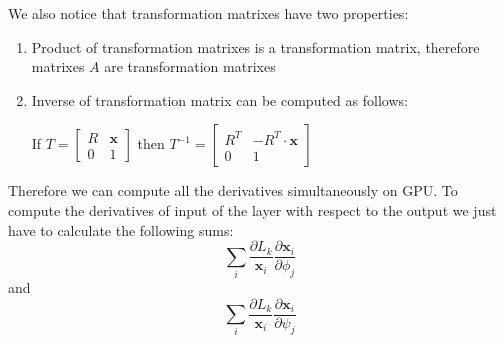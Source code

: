 We also notice that transformation matrixes have two properties:
\begin{enumerate}
    \item Product of transformation matrixes is a transformation matrix, therefore matrixes $A$ are transformation matrixes
    \item Inverse of transformation matrix can be computed as follows:

    If $
    T = \begin{bmatrix}
        R & \mathbf{x} \\
        0 & 1
    \end{bmatrix} 
    $
    then $T^{-1} = \begin{bmatrix}
        R^{T} & -R^{T}\cdot\mathbf{x} \\
        0 & 1
    \end{bmatrix} 
    $
\end{enumerate}
Therefore we can compute all the derivatives simultaneously on GPU. To compute the derivatives of input of the layer with respect to the output we just have to 
calculate the following sums:
$$\sum_i \frac{\partial L_k}{\mathbf{x}_i}\frac{\partial \mathbf{x}_i}{\partial \phi_j}$$ and 
$$\sum_i \frac{\partial L_k}{\mathbf{x}_i}\frac{\partial \mathbf{x}_i}{\partial \psi_j}$$